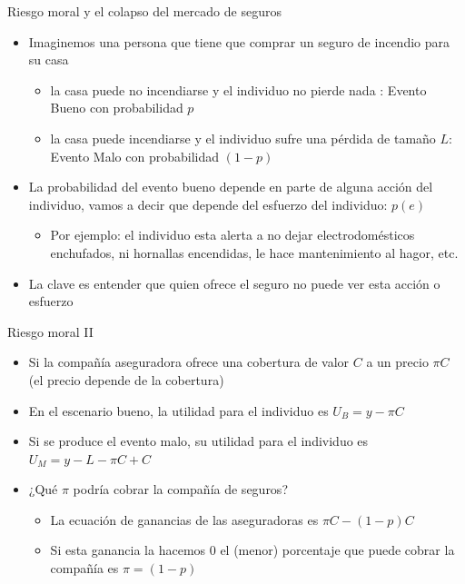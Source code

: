 \documentclass{beamer}
\begin{document}
\begin{frame}{Riesgo moral y el colapso del mercado de seguros} \label{htres}
 \begin{itemize}

    \item Imaginemos una persona que tiene que comprar un seguro de incendio para su casa
    \begin{itemize}
    \item la casa puede no incendiarse y el individuo no pierde nada : Evento Bueno con probabilidad $p$
    \item la casa puede incendiarse y el individuo sufre una pérdida de tamaño $L$: Evento Malo con probabilidad $(1-p)$ 
    \end{itemize}
    \vspace{1mm}
    \item La probabilidad del evento bueno depende en parte de alguna acción del individuo, vamos a decir que depende del esfuerzo del individuo: $p(e)$
    \begin{itemize}
    \item Por ejemplo: el individuo esta alerta a no dejar electrodomésticos enchufados, ni hornallas encendidas, le hace mantenimiento al hagor, etc. \pause
    \end{itemize}
    \item La clave es entender que quien ofrece el seguro no puede ver esta acción o esfuerzo
\end{itemize}
\end{frame}

\begin{frame}{Riesgo moral II}
    \begin{itemize}
    \item Si la compañía aseguradora ofrece una cobertura de valor $C$ a un precio $\pi C$ (el precio depende de la cobertura) \vspace{2mm}
    \item En el escenario bueno, la utilidad para el individuo es 
    $U_B = y - \pi C$
    \item Si se produce el evento malo, su utilidad para el individuo es 
    $U_M = y - L - \pi C + C$ \vspace{2mm}
    \item ¿Qué $\pi$ podría cobrar la compañía de seguros?
    \begin{itemize}
    \item La ecuación de ganancias de las aseguradoras es  
    $\pi C - (1-p) C$
    \item Si esta ganancia la hacemos $0$ el (menor) porcentaje que puede cobrar la compañía es $\pi=(1-p)$
    \end{itemize}
    \end{itemize}
\end{frame}
\end{document}
